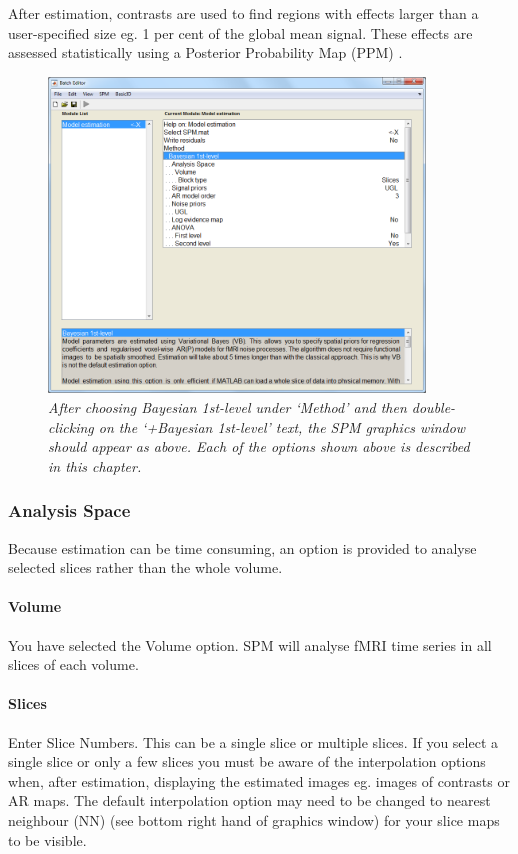 \documentclass[a4paper,titlepage]{book}
\begin{document}
After estimation, contrasts are used to find regions with effects larger than a user-specified size eg. 1 per cent of the global mean signal. These effects are assessed statistically using a Posterior Probability Map (PPM) \cite{karl_posterior}.

\begin{figure}
\includegraphics[width=100mm]{bayes_options}
\caption{\em After choosing Bayesian 1st-level under `Method' and then double-clicking on the `+Bayesian 1st-level' text, the SPM graphics window should appear as above. Each of the options shown above is described in this chapter. \label{bayes_options}}
\end{figure}

\subsubsection{Analysis Space}
Because estimation can be time consuming, an option is provided to analyse selected slices rather than the whole volume.


\paragraph{Volume}
You have selected the Volume option. SPM will analyse fMRI time series in all slices of each volume.


\paragraph{Slices}
Enter Slice Numbers. This can be a single slice or multiple slices. If you select a single slice or only a few slices you must be aware of the interpolation options when, after estimation, displaying the estimated images eg. images of contrasts or AR maps. The default interpolation option may need to be changed to nearest neighbour (NN) (see bottom right hand of graphics window) for your slice maps to be visible.
\end{document}

